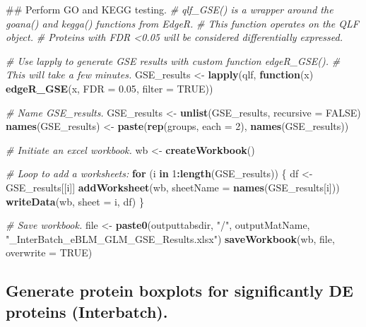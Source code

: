 \documentclass[]{article}
\newenvironment{Shaded}{\begin{snugshade}}{\end{snugshade}}
\newcommand{\KeywordTok}[1]{\textcolor[rgb]{0.13,0.29,0.53}{\textbf{#1}}}
\newcommand{\DataTypeTok}[1]{\textcolor[rgb]{0.13,0.29,0.53}{#1}}
\newcommand{\DecValTok}[1]{\textcolor[rgb]{0.00,0.00,0.81}{#1}}
\newcommand{\FloatTok}[1]{\textcolor[rgb]{0.00,0.00,0.81}{#1}}
\newcommand{\StringTok}[1]{\textcolor[rgb]{0.31,0.60,0.02}{#1}}
\newcommand{\CommentTok}[1]{\textcolor[rgb]{0.56,0.35,0.01}{\textit{#1}}}
\newcommand{\OtherTok}[1]{\textcolor[rgb]{0.56,0.35,0.01}{#1}}
\newcommand{\ControlFlowTok}[1]{\textcolor[rgb]{0.13,0.29,0.53}{\textbf{#1}}}
\newcommand{\OperatorTok}[1]{\textcolor[rgb]{0.81,0.36,0.00}{\textbf{#1}}}
\newcommand{\NormalTok}[1]{#1}
\begin{document}
\begin{Shaded}
\begin{Highlighting}[]
\NormalTok{## Perform GO and KEGG testing.}
\CommentTok{# qlf_GSE() is a wrapper around the goana() and kegga() functions from EdgeR.}
\CommentTok{# This function operates on the QLF object.}
\CommentTok{# Proteins with FDR <0.05 will be considered differentially expressed.}

\CommentTok{# Use lapply to generate GSE results with custom function edgeR_GSE().}
\CommentTok{# This will take a few minutes.}
\NormalTok{GSE_results <-}\StringTok{ }\KeywordTok{lapply}\NormalTok{(qlf, }\ControlFlowTok{function}\NormalTok{(x) }\KeywordTok{edgeR_GSE}\NormalTok{(x, }\DataTypeTok{FDR =} \FloatTok{0.05}\NormalTok{, }\DataTypeTok{filter =} \OtherTok{TRUE}\NormalTok{))}

\CommentTok{# Name GSE_results.}
\NormalTok{GSE_results <-}\StringTok{ }\KeywordTok{unlist}\NormalTok{(GSE_results, }\DataTypeTok{recursive =} \OtherTok{FALSE}\NormalTok{)}
\KeywordTok{names}\NormalTok{(GSE_results) <-}\StringTok{ }\KeywordTok{paste}\NormalTok{(}\KeywordTok{rep}\NormalTok{(groups, }\DataTypeTok{each =} \DecValTok{2}\NormalTok{), }\KeywordTok{names}\NormalTok{(GSE_results))}

\CommentTok{# Initiate an excel workbook.}
\NormalTok{wb <-}\StringTok{ }\KeywordTok{createWorkbook}\NormalTok{()}

\CommentTok{# Loop to add a worksheets:}
\ControlFlowTok{for}\NormalTok{ (i }\ControlFlowTok{in} \DecValTok{1}\OperatorTok{:}\KeywordTok{length}\NormalTok{(GSE_results)) \{}
\NormalTok{  df <-}\StringTok{ }\NormalTok{GSE_results[[i]]}
  \KeywordTok{addWorksheet}\NormalTok{(wb, }\DataTypeTok{sheetName =} \KeywordTok{names}\NormalTok{(GSE_results[i]))}
  \KeywordTok{writeData}\NormalTok{(wb, }\DataTypeTok{sheet =}\NormalTok{ i, df)}
\NormalTok{\}}

\CommentTok{# Save workbook.}
\NormalTok{file <-}\StringTok{ }\KeywordTok{paste0}\NormalTok{(outputtabsdir, }\StringTok{"/"}\NormalTok{, outputMatName, }\StringTok{"_InterBatch_eBLM_GLM_GSE_Results.xlsx"}\NormalTok{)}
\KeywordTok{saveWorkbook}\NormalTok{(wb, file, }\DataTypeTok{overwrite =} \OtherTok{TRUE}\NormalTok{)}
\end{Highlighting}
\end{Shaded}

\subsection{Generate protein boxplots for significantly DE proteins
(Interbatch).}\label{generate-protein-boxplots-for-significantly-de-proteins-interbatch.}
\end{document}
